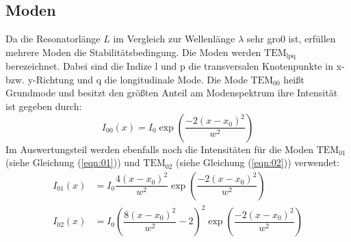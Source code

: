\subsection{Moden}
Da die Resonatorlänge $L$ im  Vergleich zur Wellenlänge $\lambda$ sehr gro0 ist, erfüllen mehrere Moden die Stabilitätsbedingung. Die Moden werden $\mathrm{TEM}_\mathrm{lpq}$ berezeichnet. Dabei sind die Indize l und p die transversalen Knotenpunkte
in x- bzw. y-Richtung und q die longitudinale Mode. Die Mode $\mathrm{TEM}_\mathrm{00}$ heißt Grundmode und besitzt den größten Anteil am Modenspektrum ihre Intensität ist gegeben durch:
\begin{equation}
  \label{eqn:grundmode}
  I_\mathrm{00}(x)=I_\mathrm{0}\exp(\dfrac{-2(x-x_\mathrm{0})^2}{w^2})
\end{equation}
Im Auswertungsteil werden ebenfalls noch die Intensitäten für die Moden $\mathrm{TEM}_\mathrm{01}$ (siehe Gleichung (\ref{eqn:01})) und $\mathrm{TEM}_\mathrm{02}$ (siehe Gleichung (\ref{eqn:02})) verwendet:
\begin{align}
  \label{eqn:01}
  I_\mathrm{01}(x)&=I_\mathrm{0}\dfrac{4(x-x_\mathrm{0})^2}{w^2}\exp(\dfrac{-2(x-x_\mathrm{0})^2}{w^2}) \\
  \label{eqn:02}
  I_\mathrm{02}(x)&=I_\mathrm{0}\left(\dfrac{8(x-x_\mathrm{0})^2}{w^2}-2\right)^2\exp(\dfrac{-2(x-x_\mathrm{0})^2}{w^2})
\end{align}
